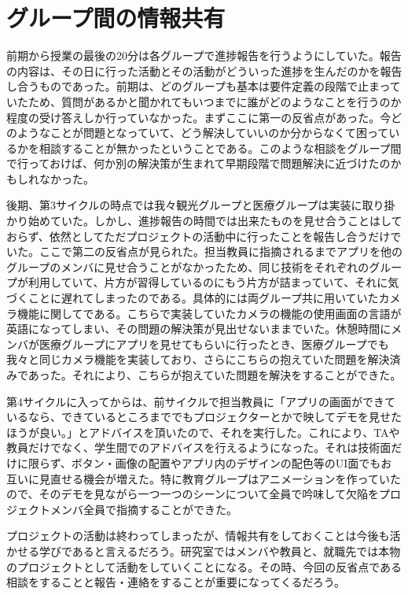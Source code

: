 \section{グループ間の情報共有}
前期から授業の最後の20分は各グループで進捗報告を行うようにしていた。報告の内容は、その日に行った活動とその活動がどういった進捗を生んだのかを報告し合うものであった。前期は、どのグループも基本は要件定義の段階で止まっていたため、質問があるかと聞かれてもいつまでに誰がどのようなことを行うのか程度の受け答えしか行っていなかった。まずここに第一の反省点があった。今どのようなことが問題となっていて、どう解決していいのか分からなくて困っているかを相談することが無かったということである。このような相談をグループ間で行っておけば、何か別の解決策が生まれて早期段階で問題解決に近づけたのかもしれなかった。
\par 後期、第3サイクルの時点では我々観光グループと医療グループは実装に取り掛かり始めていた。しかし、進捗報告の時間では出来たものを見せ合うことはしておらず、依然としてただプロジェクトの活動中に行ったことを報告し合うだけでいた。ここで第二の反省点が見られた。担当教員に指摘されるまでアプリを他のグループのメンバに見せ合うことがなかったため、同じ技術をそれぞれのグループが利用していて、片方が習得しているのにもう片方が詰まっていて、それに気づくことに遅れてしまったのである。具体的には両グループ共に用いていたカメラ機能に関してである。こちらで実装していたカメラの機能の使用画面の言語が英語になってしまい、その問題の解決策が見出せないままでいた。休憩時間にメンバが医療グループにアプリを見せてもらいに行ったとき、医療グループでも我々と同じカメラ機能を実装しており、さらにこちらの抱えていた問題を解決済みであった。それにより、こちらが抱えていた問題を解決をすることができた。
\par 第4サイクルに入ってからは、前サイクルで担当教員に「アプリの画面ができているなら、できているところまででもプロジェクターとかで映してデモを見せたほうが良い。」とアドバイスを頂いたので、それを実行した。これにより、TAや教員だけでなく、学生間でのアドバイスを行えるようになった。それは技術面だけに限らず、ボタン・画像の配置やアプリ内のデザインの配色等のUI面でもお互いに見直せる機会が増えた。特に教育グループはアニメーションを作っていたので、そのデモを見ながら一つ一つのシーンについて全員で吟味して欠陥をプロジェクトメンバ全員で指摘することができた。
\par プロジェクトの活動は終わってしまったが、情報共有をしておくことは今後も活かせる学びであると言えるだろう。研究室ではメンバや教員と、就職先では本物のプロジェクトとして活動をしていくことになる。その時、今回の反省点である相談をすることと報告・連絡をすることが重要になってくるだろう。
